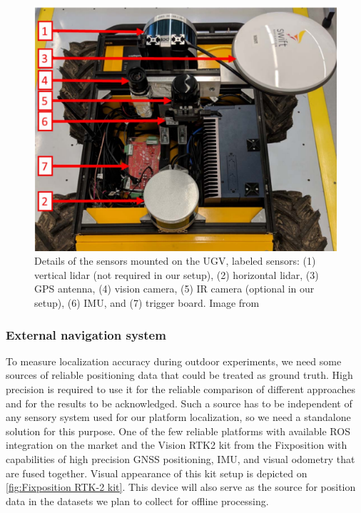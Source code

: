 \documentclass[runningheads]{llncs}
\begin{document}
\begin{figure}
    \centering
    \includegraphics[width=0.75\linewidth]{img/Husky_with_equipment.png}
    \caption{Details of the sensors mounted on the UGV, labeled sensors: (1) vertical lidar (not required in our setup), (2) horizontal lidar, (3) GPS antenna, (4) vision camera, (5) IR camera (optional in our setup), (6) IMU, and (7) trigger board. Image from \cite{AutomatedBridgeInspection_UGV_2019}}
    \label{fig:Husky equipped}
\end{figure}


\subsubsection{External navigation system}
To measure localization accuracy during outdoor experiments, we need some sources of reliable positioning data that could be treated as ground truth. High precision is required to use it for the reliable comparison of different approaches and for the results to be acknowledged. Such a source has to be independent of any sensory system used for our platform localization, so we need a standalone solution for this purpose. One of the few reliable platforms with available ROS integration on the market and the  Vision RTK2 kit from the Fixposition \cite{fixposition_vision_rtk2} with capabilities of high precision GNSS positioning, IMU, and visual odometry that are fused together. Visual appearance of this kit setup is depicted on \ref{fig:Fixposition RTK-2 kit}. This device will also serve as the source for position data in the datasets we plan to collect for offline processing.
\end{document}
